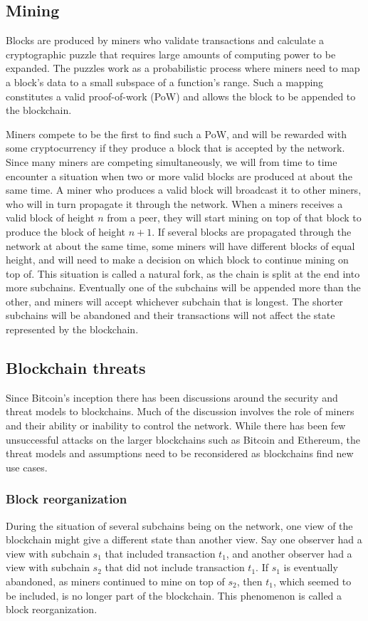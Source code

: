 \subsection{Mining}

Blocks are produced by miners who validate transactions and calculate a cryptographic puzzle that requires large amounts of computing power to be expanded. The puzzles work as a probabilistic process where miners need to map a block's data to a small subspace of a function's range. Such a mapping constitutes a valid proof-of-work (PoW) and allows the block to be appended to the blockchain. 

Miners compete to be the first to find such a PoW, and will be rewarded with some cryptocurrency if they produce a block that is accepted by the network. Since many miners are competing simultaneously, we will from time to time encounter a situation when two or more valid blocks are produced at about the same time. A miner who produces a valid block will broadcast it to other miners, who will in turn propagate it through the network. When a miners receives a valid block of height $n$ from a peer, they will start mining on top of that block to produce the block of height $n+1$. If several blocks are propagated through the network at about the same time, some miners will have different blocks of equal height, and will need to make a decision on which block to continue mining on top of. This situation is called a natural fork, as the chain is split at the end into more subchains. Eventually one of the subchains will be appended more than the other, and miners will accept whichever subchain that is longest. The shorter subchains will be abandoned and their transactions will not affect the state represented by the blockchain.


\subsection{Blockchain threats}

Since Bitcoin's inception there has been discussions around the security and threat models to blockchains. Much of the discussion involves the role of miners and their ability or inability to control the network. While there has been few unsuccessful attacks on the larger blockchains such as Bitcoin and Ethereum, the threat models and assumptions need to be reconsidered as blockchains find new use cases.

\subsubsection{Block reorganization}
During the situation of several subchains being on the network, one view of the blockchain might give a different state than another view. Say one observer had a view with subchain $s_1$ that included transaction $t_1$, and another observer had a view with subchain $s_2$ that did not include transaction $t_1$. If $s_1$ is eventually abandoned, as miners continued to mine on top of $s_2$, then $t_1$, which seemed to be included, is no longer part of the blockchain. This phenomenon is called a block reorganization.

